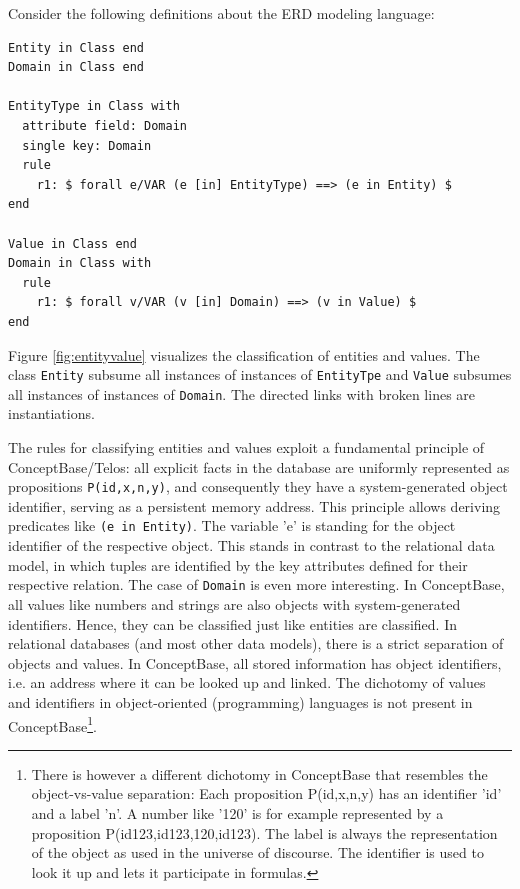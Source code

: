 Consider the following definitions about the ERD modeling language:

{\small
\begin{verbatim}
Entity in Class end
Domain in Class end

EntityType in Class with
  attribute field: Domain
  single key: Domain
  rule
    r1: $ forall e/VAR (e [in] EntityType) ==> (e in Entity) $
end

Value in Class end
Domain in Class with
  rule
    r1: $ forall v/VAR (v [in] Domain) ==> (v in Value) $
end
\end{verbatim}
}

Figure \ref{fig:entityvalue}
visualizes the classification of entities and values. 
The class {\tt Entity} subsume all instances of instances of {\tt EntityTpe}
and {\tt Value} subsumes all instances of instances of {\tt Domain}. The directed links with
broken lines are instantiations.


The rules for classifying entities and values exploit a fundamental principle
of ConceptBase/Telos: all explicit facts in the database are uniformly represented as
propositions {\tt P(id,x,n,y)}, and consequently they have
a system-generated object identifier, serving as a persistent memory address. This principle allows
deriving predicates like {\tt (e in Entity)}. The variable 'e' is 
standing for the object identifier of the respective object. This stands in
contrast to the relational data model, in which tuples are identified by
the key attributes defined for their respective relation. The case of {\tt Domain}
is even more interesting. In ConceptBase, all values like numbers and strings
are also objects with system-generated identifiers. Hence, they can be classified
just like entities are classified. In relational databases (and most other data models),
there is a strict separation of objects and values. In ConceptBase, all stored
information has object identifiers, i.e. an address where it can be looked up
and linked. The dichotomy of values and identifiers in object-oriented (programming)
languages is
not present in ConceptBase\footnote{There is however a different dichotomy in ConceptBase that
resembles the object-vs-value separation: Each proposition P(id,x,n,y) has an
identifier 'id' and a label 'n'. A number like '120' is for example represented by a proposition
P(id123,id123,120,id123). The label is always the representation of the object as
used in the universe of discourse. The identifier is used to look it up and lets it
participate in formulas.}.

